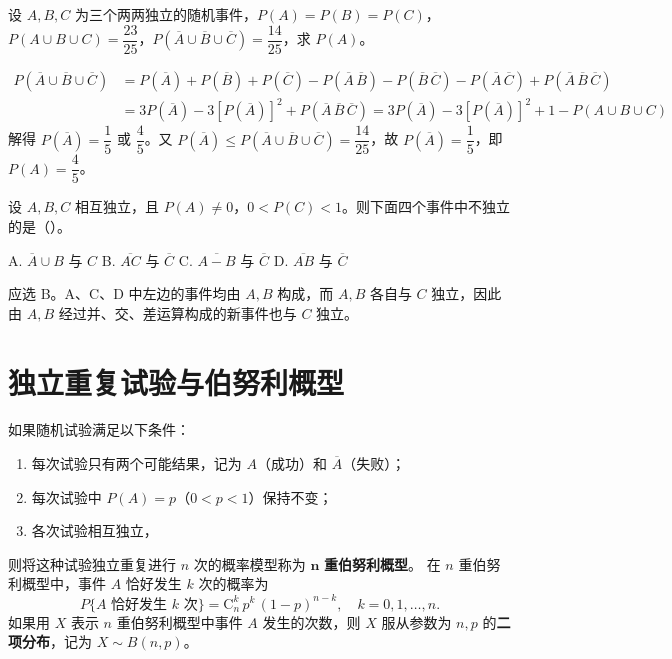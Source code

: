 \documentclass[lang=cn,11pt]{elegantbook}
\begin{document}
\begin{exercise}\label{exer:1-18}
设 \(A, B, C\) 为三个两两独立的随机事件，\(P(A)=P(B)=P(C)\)，\(P(A \cup B \cup C)=\dfrac{23}{25}\)，\(P(\overline{A} \cup \overline{B} \cup \overline{C})=\dfrac{14}{25}\)，求 \(P(A)\)。
\end{exercise}

\begin{solution}
\[
\begin{aligned}
P(\overline{A} \cup \overline{B} \cup \overline{C}) &= P(\overline{A})+P(\overline{B})+P(\overline{C}) - P(\overline{A}\,\overline{B}) - P(\overline{B}\,\overline{C}) - P(\overline{A}\,\overline{C}) + P(\overline{A}\,\overline{B}\,\overline{C}) \\
&= 3P(\overline{A}) - 3[P(\overline{A})]^2 + P(\overline{A}\,\overline{B}\,\overline{C})=3P(\overline{A}) - 3[P(\overline{A})]^2 +1-P(A \cup B \cup C)
\end{aligned}
\]
解得 \(P(\overline{A}) = \dfrac{1}{5}\) 或 \(\dfrac{4}{5}\)。又 \(P(\overline{A}) \le P(\overline{A} \cup \overline{B} \cup \overline{C}) = \dfrac{14}{25}\)，故 \(P(\overline{A}) = \dfrac{1}{5}\)，即 \(P(A) = \dfrac{4}{5}\)。
\end{solution}

\begin{exercise}[提高]\label{exer:1-58}
设 \(A,B,C\) 相互独立，且 \(P(A)\neq 0\)，\(0<P(C)<1\)。则下面四个事件中不独立的是（\quad）。\par
A. \(\overline{A}\cup B\) 与 \(C\)\quad
B. \(\overline{AC}\) 与 \(\overline{C}\)\quad
C. \(\overline{A-B}\) 与 \(\overline{C}\)\quad
D. \(\overline{AB}\) 与 \(\overline{C}\)
\end{exercise}

\begin{solution}
应选 B。A、C、D 中左边的事件均由 \(A,B\) 构成，而 \(A,B\) 各自与 \(C\) 独立，因此由 \(A,B\) 经过并、交、差运算构成的新事件也与 \(C\) 独立。
\end{solution}

\section{独立重复试验与伯努利概型}

\begin{definition}[\(n\) 重伯努利概型] \label{def:bernoulli}
如果随机试验满足以下条件：
\begin{enumerate}
    \item 每次试验只有两个可能结果，记为 \(A\)（成功）和 \(\overline{A}\)（失败）；
    \item 每次试验中 \(P(A)=p\)（\(0 < p < 1\)）保持不变；
    \item 各次试验相互独立，
\end{enumerate}
则将这种试验独立重复进行 \(n\) 次的概率模型称为 \(\mathbf{n}\) \textbf{重伯努利概型}。
在 \(n\) 重伯努利概型中，事件 \(A\) 恰好发生 \(k\) 次的概率为
\[
P\{A \text{ 恰好发生 } k \text{ 次}\} = \mathrm{C}_n^k\, p^k\, (1-p)^{n-k}, \quad k=0,1,\dots,n.
\]
如果用 \(X\) 表示 \(n\) 重伯努利概型中事件 \(A\) 发生的次数，则 \(X\) 服从参数为 \(n, p\) 的\textbf{二项分布}，记为 \(X \sim B(n,p)\)。
\end{definition}
\end{document}
